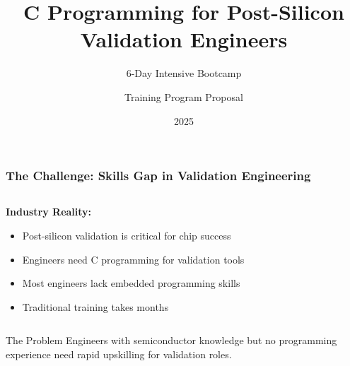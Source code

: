 \documentclass{beamer}
\title{C Programming for Post-Silicon Validation Engineers}
\subtitle{6-Day Intensive Bootcamp}
\author{Training Program Proposal}
\date{2025}
\institute{Professional Development Initiative}
\begin{document}
\frame{\titlepage}

\begin{frame}
\frametitle{The Challenge: Skills Gap in Validation Engineering}

\begin{columns}
\begin{column}{0.5\textwidth}
\textbf{Industry Reality:}
\begin{itemize}
    \item Post-silicon validation is critical for chip success
    \item Engineers need C programming for validation tools
    \item Most engineers lack embedded programming skills
    \item Traditional training takes months
\end{itemize}
\end{column}
\begin{column}{0.5\textwidth}
\begin{center}
\end{center}
\end{column}
\end{columns}

\vspace{0.5cm}
\begin{alertblock}{The Problem}
Engineers with semiconductor knowledge but no programming experience need rapid upskilling for validation roles.
\end{alertblock}
\end{frame}
\end{document}

